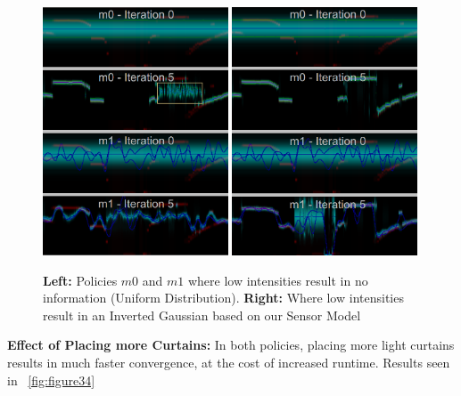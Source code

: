  \begin{figure}[h]
    \centering
    \begin{minipage}{0.5\textwidth}
        \centering
        \includegraphics[width=0.49\textwidth]{figures/InvGau.png}
        \includegraphics[width=0.49\textwidth]{figures/Uniform.png}
    \end{minipage}\hfill
    \centering
    \caption{\textbf{Left:} Policies $m0$ and $m1$ where low intensities result in no information (Uniform Distribution). \textbf{Right:} Where low intensities result in an Inverted Gaussian based on our Sensor Model}
    \label{fig:invgau}
\end{figure}

 \textbf{Effect of Placing more Curtains:} In both policies, placing more light curtains results in much faster convergence, at the cost of increased runtime. Results seen in ~\ref{fig:figure34}

